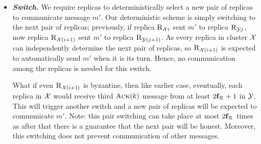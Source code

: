 \begin{itemize}[wide]
\item {\bf \em Switch.}
We require replicas to deterministically select a new pair of replicas to communicate message $m'$. 
Our deterministic scheme is simply switching to the next pair of replicas; 
previously, if replica $\textsc{R}_{{\mathcal{X}}{i}}$ sent $m'$ to replica $\textsc{R}_{{\mathcal{Y}}{j}}$, now 
replica $\textsc{R}_{{\mathcal{X}}{(i+1)}}$ sent $m'$ to replica $\textsc{R}_{{\mathcal{Y}}{(j+1)}}$.
As every replica in cluster $\mathcal{X}$ can independently determine the next pair of replicas, 
so $\textsc{R}_{{\mathcal{X}}{(i+1)}}$ is expected to automatically send $m'$ when it is its turn. 
Hence, no communication among the replicas is needed for this switch.

What if even $\textsc{R}_{{\mathcal{X}}{(i+1)}}$ is byzantine, then like earlier case, eventually, 
each replica in $\mathcal{X}$ would receive third $\textsc{Ack}(k)$ message from at least $2\textbf{f}_{\mathcal{R}_{\mathcal{}}}+1$ in $\mathcal{Y}$. 
This will trigger another switch and a new pair of replicas will be expected to communicate $m'$.
Note: this pair switching can take place at most $2\textbf{f}_{\mathcal{R}_{\mathcal{}}}$ times as after that there is 
a guarantee that the next pair will be honest.
Moreover, this switching does not prevent communication of other messages.



\end{itemize}

